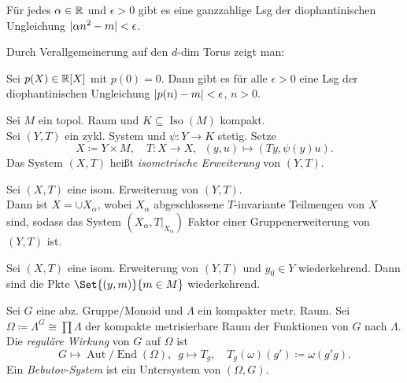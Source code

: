 \documentclass{cheat-sheet}
\DeclareMathOperator{\Aut}{Aut} %
\DeclareMathOperator{\End}{End} %
\newcommand{\AutEnd}{\Aut\!/\!\End} %
\DeclareMathOperator{\Iso}{Iso} %
\begin{document}
\begin{prop}
  Für jedes $\alpha \in \mathbb{R}$ und $\epsilon > 0$ gibt es eine ganzzahlige Lsg der diophantinischen Ungleichung
  $\lvert\alpha n^2 - m\rvert < \epsilon$.
\end{prop}

\begin{bem}
  Durch Verallgemeinerung auf den $d$-dim Torus zeigt man:
\end{bem}

\begin{prop}
  Sei $p(X) \in \mathbb{R}[X]$ mit $p(0) = 0$. Dann gibt es für alle $\epsilon > 0$ eine Lsg der diophantinischen Ungleichung
  $\lvert p(n) - m\rvert < \epsilon$, $n > 0$.
\end{prop}

\begin{defn}
  Sei $M$ ein topol. Raum und $K \subseteq \Iso(M)$ kompakt. \\
  Sei $(Y, T)$ ein zykl. System und $\psi : Y \to K$ stetig. Setze
  \[
    X \coloneqq Y \!\times\! M, \quad
    T : X \to X, \enspace (y, u) \mapsto (Ty, \psi(y)u).
  \]
  Das System $(X, T)$ heißt \emph{isometrische Erweiterung} von $(Y, T)$.
\end{defn}

\begin{prop}
  Sei $(X, T)$ eine isom. Erweiterung von $(Y, T)$. \\
  Dann ist $X = \cup X_\alpha$, wobei $X_\alpha$ abgeschlossene $T$-invariante Teilmengen von $X$ sind, sodass das System $(X_\alpha, T|_{X_\alpha})$ Faktor einer Gruppenerweiterung von $(Y, T)$ ist.
\end{prop}

\begin{prop}
  Sei $(X, T)$ eine isom. Erweiterung von $(Y, T)$ und $y_0 \in Y$ wiederkehrend.
  Dann sind die Pkte $\Set{(y, m)}{m \in M}$ wiederkehrend.
\end{prop}


\begin{defn}
  Sei $G$ eine abz. Gruppe/Monoid und $\Lambda$ ein kompakter metr. Raum.
  Sei $\Omega \coloneqq \Lambda^G \cong \prod \Lambda$ der kompakte metrisierbare Raum der Funktionen von $G$ nach $\Lambda$. Die \emph{reguläre Wirkung} von $G$ auf $\Omega$ ist
  \[
    G \mapsto \AutEnd(\Omega), \enspace g \mapsto T_g, \quad
    T_g(\omega)(g') \coloneqq \omega(g'g).
  \]
  Ein \emph{Bebutov-System} ist ein Untersystem von $(\Omega, G)$.
\end{defn}
\end{document}
